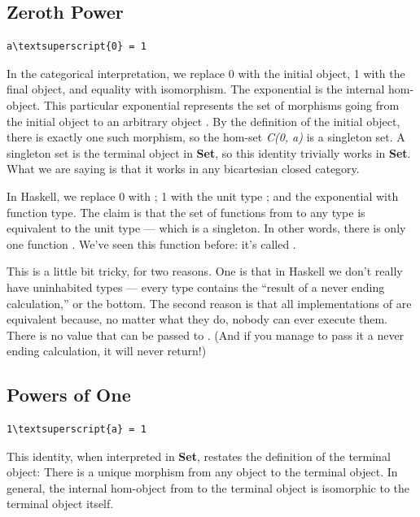 \subsection{Zeroth Power}\label{zeroth-power}

\begin{Verbatim}[commandchars=\\\{\}]
a\textsuperscript{0} = 1
\end{Verbatim}
In the categorical interpretation, we replace 0 with the initial object,
1 with the final object, and equality with isomorphism. The exponential
is the internal hom-object. This particular exponential represents the
set of morphisms going from the initial object to an arbitrary object
. By the definition of the initial object, there is exactly
one such morphism, so the hom-set \emph{C(0, a)} is a singleton set. A
singleton set is the terminal object in \textbf{Set}, so this identity
trivially works in \textbf{Set}. What we are saying is that it works in
any bicartesian closed category.

In Haskell, we replace 0 with ; 1 with the unit type
\code{()}; and the exponential with function type. The claim is that
the set of functions from  to any type  is
equivalent to the unit type --- which is a singleton. In other words,
there is only one function . We've seen
this function before: it's called .

This is a little bit tricky, for two reasons. One is that in Haskell we
don't really have uninhabited types --- every type contains the ``result
of a never ending calculation,'' or the bottom. The second reason is
that all implementations of  are equivalent because, no
matter what they do, nobody can ever execute them. There is no value
that can be passed to . (And if you manage to pass it a
never ending calculation, it will never return!)

\subsection{Powers of One}\label{powers-of-one}

\begin{Verbatim}[commandchars=\\\{\}]
1\textsuperscript{a} = 1
\end{Verbatim}
This identity, when interpreted in \textbf{Set}, restates the definition
of the terminal object: There is a unique morphism from any object to
the terminal object. In general, the internal hom-object from 
to the terminal object is isomorphic to the terminal object itself.

